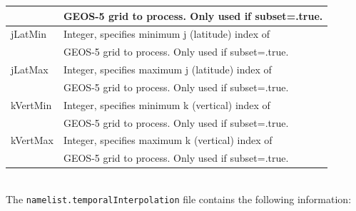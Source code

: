 \begin{tabular}{|l|l|}
 & GEOS-5 grid to process. Only used if subset=.true. \\ \hline
jLatMin 
& Integer, specifies minimum j (latitude) index of  \\
 & GEOS-5 grid to process. Only used if subset=.true. \\ \hline
jLatMax 
& Integer, specifies maximum j (latitude) index of  \\
 & GEOS-5 grid to process. Only used if subset=.true. \\ \hline
kVertMin 
& Integer, specifies minimum k (vertical) index of \\
 & GEOS-5 grid to process. Only used if subset=.true. \\ \hline
kVertMax 
& Integer, specifies maximum k (vertical) index of \\
 & GEOS-5 grid to process. Only used if subset=.true. \\ \hline
\end{tabular} \\

\newpage
The \texttt{namelist.temporalInterpolation} file contains the following
information:

